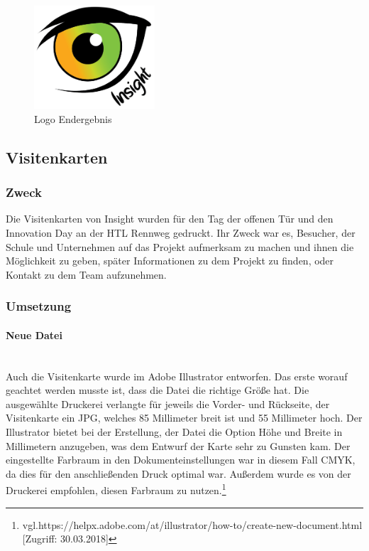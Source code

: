 \begin{figure}[H] 
  \centering
     \includegraphics[width=0.4\textwidth]{design_abb5.png}
  \caption{Logo Endergebnis}
\end{figure}

\subsection{Visitenkarten}
\subsubsection{Zweck}
Die Visitenkarten von Insight wurden für den Tag der offenen Tür und den Innovation Day an der HTL Rennweg gedruckt. Ihr Zweck war es, Besucher, der Schule und Unternehmen auf das Projekt aufmerksam zu machen und ihnen die Möglichkeit zu geben, später Informationen zu dem Projekt zu finden, oder Kontakt zu dem Team aufzunehmen.
\subsubsection{Umsetzung}

\paragraph{Neue Datei}
\leavevmode \\
Auch die Visitenkarte wurde im Adobe Illustrator entworfen. Das erste worauf geachtet werden musste ist, dass die Datei die richtige Größe hat. Die ausgewählte Druckerei verlangte für jeweils die Vorder- und Rückseite, der Visitenkarte ein JPG, welches 85 Millimeter breit ist und 55 Millimeter hoch. Der Illustrator bietet bei der Erstellung, der Datei die Option Höhe und Breite in Millimetern anzugeben, was dem Entwurf der Karte sehr zu Gunsten kam. Der eingestellte Farbraum in den Dokumenteinstellungen war in diesem Fall CMYK, da dies für den anschließenden Druck optimal war. Außerdem wurde es von der Druckerei empfohlen, diesen Farbraum zu nutzen.\footnote{\label{} vgl.https://helpx.adobe.com/at/illustrator/how-to/create-new-document.html [Zugriff: 30.03.2018]}

